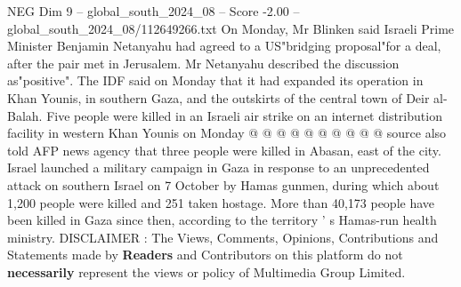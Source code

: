 \begin{textsample}{NEG Dim 9 – global\_south\_2024\_08 – Score -2.00 – global\_south\_2024\_08/112649266.txt}
On Monday, Mr Blinken said Israeli Prime Minister Benjamin Netanyahu had agreed to a US"bridging proposal"for a deal, after the pair met in Jerusalem.
Mr Netanyahu described the discussion as"positive".
The IDF said on Monday that it had expanded its operation in Khan Younis, in southern Gaza, and the outskirts of the central town of Deir al-Balah.
Five people were killed in an Israeli air strike on an internet distribution facility in western Khan Younis on Monday @ @ @ @ @ @ @ @ @ @ source also told AFP news agency that three people were killed in Abasan, east of the city.
Israel launched a military campaign in Gaza in response to an unprecedented attack on southern Israel on 7 October by Hamas gunmen, during which about 1,200 people were killed and 251 taken hostage.
More than 40,173 people have been killed in Gaza since then, according to the territory ' s Hamas-run health ministry.
DISCLAIMER : The Views, Comments, Opinions, Contributions and Statements made by \textbf{Readers} and Contributors on this platform do not \textbf{necessarily} represent the views or policy of Multimedia Group Limited.

\end{textsample}
